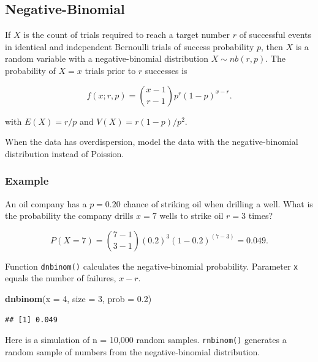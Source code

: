 \documentclass[
]{book}
\newenvironment{Shaded}{\begin{snugshade}}{\end{snugshade}}
\newcommand{\DataTypeTok}[1]{\textcolor[rgb]{0.13,0.29,0.53}{#1}}
\newcommand{\DecValTok}[1]{\textcolor[rgb]{0.00,0.00,0.81}{#1}}
\newcommand{\FloatTok}[1]{\textcolor[rgb]{0.00,0.00,0.81}{#1}}
\newcommand{\KeywordTok}[1]{\textcolor[rgb]{0.13,0.29,0.53}{\textbf{#1}}}
\newcommand{\NormalTok}[1]{#1}
\begin{document}
\hypertarget{negative-binomial}{%
\subsection{Negative-Binomial}\label{negative-binomial}}

If \(X\) is the count of trials required to reach a target number \(r\) of successful events in identical and independent Bernoulli trials of success probability \(p\), then \(X\) is a random variable with a negative-binomial distribution \(X \sim nb(r,p)\). The probability of \(X=x\) trials prior to \(r\) successes is

\[f(x;r, p) = {{x - 1} \choose {r - 1}} p^r (1-p)^{x-r}.\]

with \(E(X)=r/p\) and \(V(X) = r(1-p)/p^2\).

When the data has overdispersion, model the data with the negative-binomial distribution instead of Poission.

\hypertarget{example-8}{%
\subsubsection*{Example}\label{example-8}}

An oil company has a \(p = 0.20\) chance of striking oil when drilling a well. What is the probability the company drills \(x = 7\) wells to strike oil \(r = 3\) times?

\[P(X=7) = {{7 - 1} \choose {3 - 1}} (0.2)^3 (1-0.2)^{(7-3)} = 0.049.\]

Function \texttt{dnbinom()} calculates the negative-binomial probability. Parameter \texttt{x} equals the number of failures, \(x - r\).

\begin{Shaded}
\begin{Highlighting}[]
\KeywordTok{dnbinom}\NormalTok{(}\DataTypeTok{x =} \DecValTok{4}\NormalTok{, }\DataTypeTok{size =} \DecValTok{3}\NormalTok{, }\DataTypeTok{prob =} \FloatTok{0.2}\NormalTok{)}
\end{Highlighting}
\end{Shaded}

\begin{verbatim}
## [1] 0.049
\end{verbatim}

Here is a simulation of n = 10,000 random samples. \texttt{rnbinom()} generates a random sample of numbers from the negative-binomial distribution.
\end{document}
